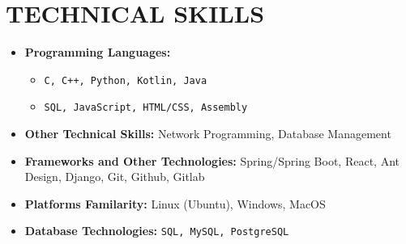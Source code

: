 \section{TECHNICAL SKILLS}

\begin{multicols}{2}
  \begin{itemize}[leftmargin=0.25in, itemsep=1pt]
    
    \item \textbf{Programming Languages:} 
      \begin{itemize}[label={-}, leftmargin=0.2in]
        \item \texttt{C, C++, Python, Kotlin, Java}
        \item \texttt{SQL, JavaScript, HTML/CSS, Assembly}
      \end{itemize}
      
    \item \textbf{Other Technical Skills:}
      Network Programming, Database Management
      
  \end{itemize}
  \vspace{\fill}
  \begin{itemize}[leftmargin=0.25in, itemsep=1pt]
    \item \textbf{Frameworks and Other Technologies:}
      Spring/Spring Boot, React, Ant Design, Django, Git, Github, Gitlab
    
    \item \textbf{Platforms Familarity:}
      Linux (Ubuntu), Windows, MacOS
    
    \item \textbf{Database Technologies:} 
      \texttt{SQL, MySQL, PostgreSQL}
  \end{itemize}
\end{multicols}

